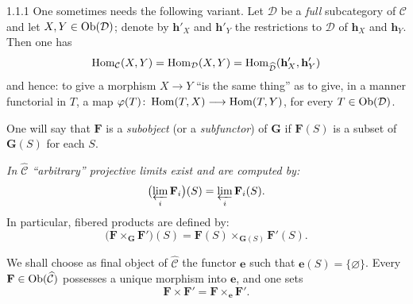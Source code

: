 \begin{remark}{1.1.1}
\label{I.1.1.1}
{\renewcommand{\thefootnote}{(4)}}%
One sometimes needs the following variant. Let \(\mathcal{D}\) be a
\emph{full} subcategory of \(\mathcal{C}\) and let
\(X,Y\in\operatorname{Ob}(\mathcal{D})\); denote by \(\mathbf{h}'_{X}\) and
\(\mathbf{h}'_{Y}\) the restrictions to \(\mathcal{D}\) of
\(\mathbf{h}_{X}\) and \(\mathbf{h}_{Y}\). Then one has
\[
\operatorname{Hom}_{\mathcal{C}}(X,Y)=\operatorname{Hom}_{\mathcal{D}}(X,Y)
=\operatorname{Hom}_{\widehat{\mathcal{D}}}(\mathbf{h}'_{X},\mathbf{h}'_{Y})
\]
and hence: to give a morphism \(X\to Y\) ``is the same thing'' as to
give, in a manner functorial in \(T\), a map
\(\varphi(T)\colon\operatorname{Hom}(T,X)\longrightarrow\operatorname{Hom}(T,Y)\), for every
\(T\in\operatorname{Ob}(\mathcal{D})\).
\end{remark}

{\renewcommand{\thefootnote}{(5)}}%
One will say that \(\mathbf{F}\) is a \emph{subobject} (or a
\emph{subfunctor}) of \(\mathbf{G}\) if \(\mathbf{F}(S)\) is a subset of
\(\mathbf{G}(S)\) for each \(S\).

\emph{In \(\widehat{\mathcal{C}}\) ``arbitrary'' projective limits exist
and are computed by:}%
{\renewcommand{\thefootnote}{(6)}}
\[
\bigl(\varprojlim_{i}\mathbf{F}_{i}\bigr)(S)
=\varprojlim_{i}\mathbf{F}_{i}(S).
\]
In particular, fibered products are defined
by:%
{\renewcommand{\thefootnote}{(7)}}
\[
\bigl(\mathbf{F}\times_{\mathbf{G}}\mathbf{F}'\bigr)(S)
=\mathbf{F}(S)\times_{\mathbf{G}(S)}\mathbf{F}'(S).
\]

We shall choose as final object of \(\widehat{\mathcal{C}}\) the functor
\(\mathbf{e}\) such that \(\mathbf{e}(S)=\{\varnothing\}\)\/.%
{\renewcommand{\thefootnote}{(8)}}
Every \(\mathbf{F}\in\operatorname{Ob}(\widehat{\mathcal{C}})\) possesses a unique
morphism into \(\mathbf{e}\), and one sets
\[
\mathbf{F}\times\mathbf{F}'=\mathbf{F}\times_{\mathbf{e}}\mathbf{F}'.
\]

